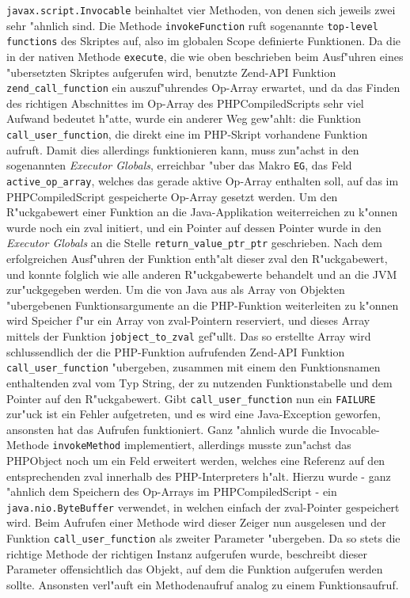 \texttt{javax.script.Invocable} beinhaltet vier Methoden, von denen sich jeweils zwei sehr "ahnlich sind. Die Methode \texttt{invokeFunction} ruft sogenannte \texttt{top-level functions}
des Skriptes auf, also im globalen Scope definierte Funktionen. Da die in der nativen Methode \texttt{execute}, die wie oben beschrieben beim Ausf"uhren 
eines "ubersetzten Skriptes aufgerufen wird, benutzte Zend-API Funktion \texttt{zend\_call\_function} ein auszuf"uhrendes Op-Array erwartet, und da das Finden des
richtigen Abschnittes im Op-Array des PHPCompiledScripts sehr viel Aufwand bedeutet h"atte, wurde ein anderer Weg gew"ahlt: die Funktion \texttt{call\_user\_function}, die
direkt eine im PHP-Skript vorhandene Funktion aufruft. Damit dies allerdings funktionieren kann, muss zun"achst in den sogenannten \emph{Executor Globals}, erreichbar
"uber das Makro \texttt{EG}, das Feld \texttt{active\_op\_array}, welches das gerade aktive Op-Array enthalten soll, auf das im PHPCompiledScript gespeicherte
Op-Array gesetzt werden.
Um den R"uckgabewert einer Funktion an die Java-Applikation weiterreichen zu k"onnen wurde noch ein zval initiert, und ein Pointer auf dessen Pointer wurde in den 
\emph{Executor Globals} an die Stelle \texttt{return\_value\_ptr\_ptr} geschrieben. Nach dem erfolgreichen Ausf"uhren der Funktion enth"alt dieser zval den R"uckgabewert,
und konnte folglich wie alle anderen R"uckgabewerte behandelt und an die JVM zur"uckgegeben werden.
Um die von Java aus als Array von Objekten "ubergebenen Funktionsargumente an die PHP-Funktion weiterleiten zu k"onnen wird Speicher f"ur ein Array
von zval-Pointern reserviert, und dieses Array mittels der Funktion \texttt{jobject\_to\_zval} gef"ullt. Das so erstellte Array wird schlussendlich der die PHP-Funktion
aufrufenden Zend-API Funktion \texttt{call\_user\_function} "ubergeben, zusammen mit einem den Funktionsnamen enthaltenden zval vom Typ String, der zu nutzenden 
Funktionstabelle und dem Pointer auf den R"uckgabewert. Gibt \texttt{call\_user\_function} nun ein \texttt{FAILURE} zur"uck ist ein Fehler aufgetreten, und es wird
eine Java-Exception geworfen, ansonsten hat das Aufrufen funktioniert.
Ganz "ahnlich wurde die Invocable-Methode \texttt{invokeMethod} implementiert, allerdings musste zun"achst das PHPObject noch um ein Feld erweitert werden, welches
eine Referenz auf den entsprechenden zval innerhalb des PHP-Interpreters h"alt. Hierzu wurde - ganz "ahnlich dem Speichern des Op-Arrays im PHPCompiledScript -
ein \texttt{java.nio.ByteBuffer} verwendet, in welchen einfach der zval-Pointer gespeichert wird. Beim Aufrufen einer Methode wird dieser Zeiger nun ausgelesen und
der Funktion \texttt{call\_user\_function} als zweiter Parameter "ubergeben. Da so stets die richtige Methode der richtigen Instanz aufgerufen wurde,
beschreibt dieser Parameter offensichtlich das Objekt, auf dem die Funktion aufgerufen werden sollte. Ansonsten verl"auft ein Methodenaufruf analog
zu einem Funktionsaufruf.

